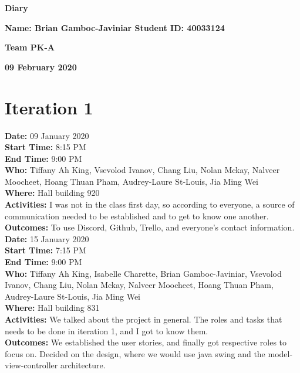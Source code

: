 \documentclass[12pt]{article}
\begin{document}
\vspace*{0.2in}
\centerline{\bf\Large Diary}

\vspace*{0.2in}
\centerline{\bf\Large Name: Brian Gamboc-Javiniar   Student ID: 40033124}

\vspace*{0.2in}
\centerline{\bf\Large Team PK-A}

\vspace*{0.2in}
\centerline{\bf\Large 09 February 2020}

\section{Iteration 1}

{\bf Date:} 09 January 2020\\
{\bf Start Time:} 8:15 PM\\
{\bf End Time:} 9:00 PM \\
{\bf Who:} Tiffany Ah King, Vsevolod Ivanov, Chang Liu, Nolan Mckay, Nalveer Moocheet, Hoang Thuan Pham, Audrey-Laure St-Louis, Jia Ming Wei\\
{\bf Where:} Hall building 920 \\
{\bf Activities:} I was not in the class first day, so according to everyone, a source of communication needed to be established and to get to know one another.\\
{\bf Outcomes:} To use Discord, Github, Trello, and everyone's contact information.\\

{\bf Date:} 15 January 2020\\
{\bf Start Time:} 7:15 PM\\
{\bf End Time:} 9:00 PM \\
{\bf Who:} Tiffany Ah King, Isabelle Charette, Brian Gamboc-Javiniar, Vsevolod Ivanov, Chang Liu, Nolan Mckay, Nalveer Moocheet, Hoang Thuan Pham, Audrey-Laure St-Louis, Jia Ming Wei\\
{\bf Where:} Hall building 831 \\
{\bf Activities:} We talked about the project in general. The roles and tasks that needs to be done in iteration 1, and I got to know them.\\
{\bf Outcomes:} We established the user stories, and finally got respective roles to focus on. Decided on the design, where we would use java swing and the model-view-controller architecture.\\
\end{document}
